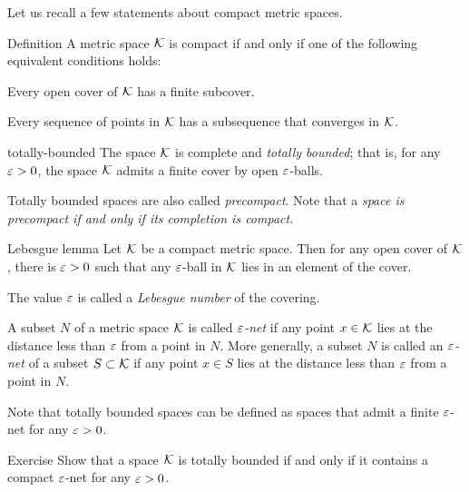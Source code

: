 Let us recall a few statements about compact metric spaces.

\begin{thm}{Definition}\label{def:compact}
A metric space $\mathcal{K}$ is compact if and only if one of the following equivalent conditions holds:

\begin{subthm}{}
 Every open cover of $\mathcal{K}$ has a finite subcover.
\end{subthm}

\begin{subthm}{}
 Every sequence of points in $\mathcal{K}$ has a subsequence that converges in $\mathcal{K}$.
\end{subthm}

\begin{subthm}{totally-bounded}
The space $\mathcal{K}$ is complete and \emph{totally bounded}; that is, for any $\varepsilon>0$, the space $\mathcal{K}$ admits a finite cover by open $\varepsilon$-balls.
\end{subthm}

\end{thm}

Totally bounded spaces are also called \emph{precompact}.
Note that a \textit{space is precompact if and only if its completion is compact}.

\begin{thm}{Lebesgue lemma}
Let $\mathcal{K}$ be a compact metric space.
Then for any open cover of $\mathcal{K}$, there is $\varepsilon>0$ such that any $\varepsilon$-ball in $\mathcal{K}$ lies in an element of the cover.

The value $\varepsilon$ is called a \emph{Lebesgue number} of the covering.
\end{thm}

A subset $N$ of a metric space $\mathcal{K}$ is called \emph{$\varepsilon$-net} if any point $x\in \mathcal{K}$ lies at the distance less than $\varepsilon$ from a point in $N$.
More generally, a subset $N$ is called an \emph{$\varepsilon$-net} of a subset $S\subset\mathcal{K}$ if any point $x\in S$ lies at the distance less than $\varepsilon$ from a point in $N$. 

Note that totally bounded spaces can be defined as spaces that admit a finite $\varepsilon$-net for any $\varepsilon>0$.

\begin{thm}{Exercise}\label{ex:compact-net}
Show that a space $\mathcal{K}$ is totally bounded if and only if it contains a compact $\varepsilon$-net for any $\varepsilon>0$. 
\end{thm}


